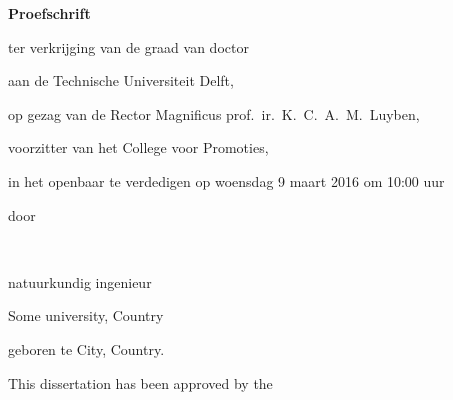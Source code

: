 \begin{titlepage}


\begin{center}


\vspace*{2\bigskipamount}

{\makeatletter
\titlestyle\bfseries\LARGE\@title
\makeatother}

{\makeatletter
\ifx\@subtitle\undefined\else
    \bigskip
    \titlefont\titleshape\Large\@subtitle
\fi
\makeatother}

\vfill


{\Large\titlefont\bfseries Proefschrift}

\bigskip
\bigskip

ter verkrijging van de graad van doctor

aan de Technische Universiteit Delft,

op gezag van de Rector Magnificus prof.~ir.~K.~C.~A.~M.~Luyben,

voorzitter van het College voor Promoties,

in het openbaar te verdedigen op woensdag 9 maart 2016 om 10:00 uur

\bigskip
\bigskip

door

\bigskip
\bigskip

\makeatletter
{\Large\titlefont\bfseries\@firstname\ {\titleshape\@lastname}}
\makeatother

\bigskip
\bigskip

natuurkundig ingenieur

Some university, Country

geboren te City, Country.

\vspace*{2\bigskipamount}

\end{center}

\clearpage
\thispagestyle{empty}

\noindent This dissertation has been approved by the


\end{titlepage}
